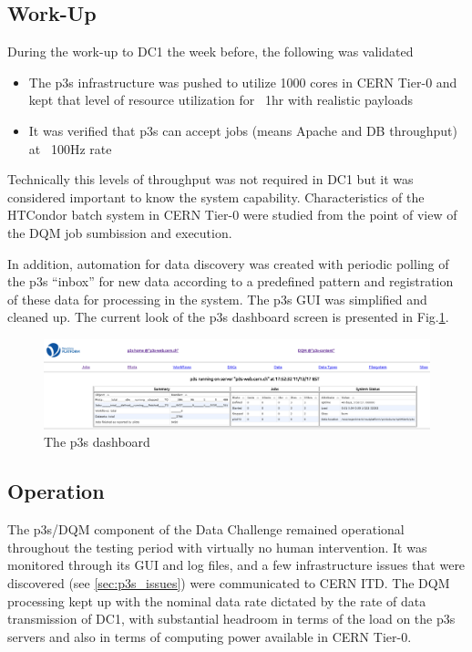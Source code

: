 \documentclass[pdftex,12pt,letter]{article}
\begin{document}
\subsection{Work-Up}

During the work-up to DC1 the week before, the following was validated
\begin{itemize}

\item The p3s infrastructure was pushed to utilize 1000 cores in CERN Tier-0 and kept that level of resource utilization for ~1hr
with realistic payloads
\item It was verified that p3s can accept jobs (means Apache and DB throughput) at ~100Hz rate

\end{itemize}
\noindent Technically this levels of throughput was not required in DC1 but it was considered important to know the system capability.
Characteristics of the HTCondor batch system in CERN Tier-0 were studied from the point of view of the DQM job sumbission and
execution.

In addition, automation for data discovery was created with periodic polling of the p3s ``inbox'' for new data according to a predefined pattern
and registration of these data for processing in the system. The p3s GUI was simplified and cleaned up. The current look of the p3s
dashboard screen is presented in Fig.\ref{fig:p3s_dash}.
\begin{figure}[tbh]
  \centering
  \includegraphics[width=1.0\textwidth]{./ReportImages/p3s_20171113_1.png}
  \caption{The p3s dashboard}
  \label{fig:p3s_dash}
\end{figure}

\subsection{Operation}
The p3s/DQM component of the Data Challenge remained operational throughout the testing period with virtually no human intervention.
It was monitored through its GUI and log files, and a few infrastructure issues that were discovered (see \ref{sec:p3s_issues}) were communicated
to CERN ITD. The DQM processing kept up with the nominal data rate dictated by the rate of data transmission of DC1, with substantial headroom in
terms of the load on the p3s servers and also in terms of computing power available in CERN Tier-0.
\end{document}
